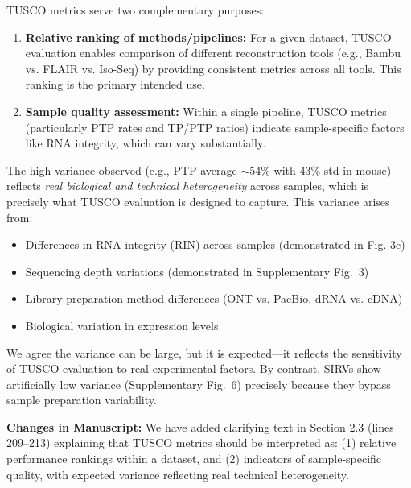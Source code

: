 \documentclass[11pt]{article}
\begin{document}
\begin{responseboxnew}
    TUSCO metrics serve two complementary
    purposes:

    \begin{enumerate}
      \item \textbf{Relative ranking of methods/pipelines:} For a given dataset,
        TUSCO evaluation enables comparison of different reconstruction tools (e.g., Bambu
        vs. FLAIR vs. Iso-Seq) by providing consistent metrics across all tools.
        This ranking is the primary intended use.

      \item \textbf{Sample quality assessment:} Within a single pipeline, TUSCO metrics
        (particularly PTP rates and TP/PTP ratios) indicate sample-specific factors
        like RNA integrity, which can vary substantially.
    \end{enumerate}

    \vspace{0.3cm}
    The high variance observed (e.g., PTP average
    $\sim$54\% with 43\% std in mouse) reflects \textit{real biological and
    technical heterogeneity} across samples, which is precisely what TUSCO evaluation is designed
    to capture. This variance arises from:

    \begin{itemize}
      \item Differences in RNA integrity (RIN) across samples (demonstrated in
        Fig. 3c)

      \item Sequencing depth variations (demonstrated in Supplementary Fig.~3)

      \item Library preparation method differences (ONT vs. PacBio, dRNA vs. cDNA)

      \item Biological variation in expression levels
    \end{itemize}

    We agree the variance can be large, but it is expected---it reflects the sensitivity of TUSCO evaluation
    to real experimental factors. By contrast, SIRVs show
    artificially low variance (Supplementary Fig.~6) precisely because they bypass sample preparation
    variability.

    \vspace{0.3cm}
    \textbf{Changes in Manuscript:} We have added clarifying text in Section 2.3 (lines 209--213)
    explaining that TUSCO metrics should be interpreted as: (1) relative performance
    rankings within a dataset, and (2) indicators of sample-specific quality, with
    expected variance reflecting real technical heterogeneity.
\end{responseboxnew}
\end{document}
